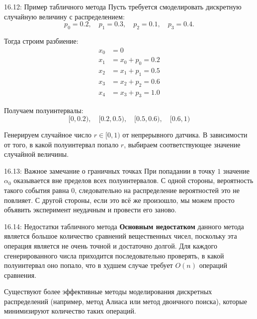 \documentclass[a4paper,12pt]{article}
\begin{document}
	\begin{examplebox}{16.12: Пример табличного метода}
		Пусть требуется смоделировать дискретную случайную величину с распределением:
		\[ p_0 = 0.2, \quad p_1 = 0.3, \quad p_2 = 0.1, \quad p_3 = 0.4. \]
		
		Тогда строим разбиение:
		\begin{align*}
			x_0 &= 0 \\
			x_1 &= x_0 + p_0 = 0.2 \\
			x_2 &= x_1 + p_1 = 0.5 \\
			x_3 &= x_2 + p_2 = 0.6 \\
			x_4 &= x_3 + p_3 = 1.0
		\end{align*}
		
		Получаем полуинтервалы:
		\[ [0, 0.2), \quad [0.2, 0.5), \quad [0.5, 0.6), \quad [0.6, 1) \]
		
		Генерируем случайное число \(r \in [0,1)\) от непрерывного датчика. В зависимости от того, в какой полуинтервал попало \(r\), выбираем соответствующее значение случайной величины.
	\end{examplebox}
	
	\begin{importantbox}{16.13: Важное замечание о граничных точках}
		При попадании в точку \(1\) значение \(\alpha_0\) оказывается вне пределов всех полуинтервалов. С одной стороны, вероятность такого события равна \(0\), следовательно на распределение вероятностей это не повлияет. С другой стороны, если это всё же произошло, мы можем просто объявить эксперимент неудачным и провести его заново.
	\end{importantbox}
	
	\begin{remarkbox}{16.14: Недостатки табличного метода}
		\textbf{Основным недостатком} данного метода является большое количество сравнений вещественных чисел, поскольку эта операция является не очень точной и достаточно долгой. Для каждого сгенерированного числа приходится последовательно проверять, в какой полуинтервал оно попало, что в худшем случае требует \(O(n)\) операций сравнения.
		
		Существуют более эффективные методы моделирования дискретных распределений (например, метод Алиаса или метод двоичного поиска), которые минимизируют количество таких операций.
	\end{remarkbox}
	
\end{document}
